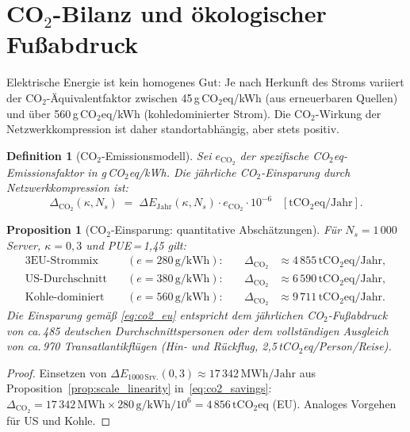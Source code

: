 ﻿\documentclass[12pt, a4paper, openany]{report}
\newtheorem{proposition}[theorem]{Proposition}
\newtheorem{definition}[theorem]{Definition}
\begin{document}
\section{CO\texorpdfstring{$_2$}{2}-Bilanz und ökologischer Fußabdruck}
\label{sec:co2}

Elektrische Energie ist kein homogenes Gut: Je nach Herkunft des
Stroms variiert der CO{$_2$}-Äquivalentfaktor zwischen 45\,g\,CO$_2$eq/kWh
(aus erneuerbaren Quellen) und über 560\,g\,CO$_2$eq/kWh (kohledominierter
Strom).  Die CO$_2$-Wirkung der Netzwerkkompression ist daher
standortabhängig, aber stets positiv.

\begin{definition}[CO$_2$-Emissionsmodell]
\label{def:co2_model}
Sei $e_{\mathrm{CO_2}}$ der spezifische CO$_2$eq-Emissionsfaktor in
g\,CO$_2$eq/kWh.  Die jährliche CO$_2$-Einsparung durch
Netzwerkkompression ist:
\begin{equation}
  \label{eq:co2_savings}
  \Delta_{\mathrm{CO_2}}(\kappa, N_s)
  \;=\;
  \Delta E_{\mathrm{Jahr}}(\kappa, N_s) \cdot e_{\mathrm{CO_2}} \cdot 10^{-6}
  \;\;\;[\mathrm{tCO_2eq/Jahr}].
\end{equation}
\end{definition}

\begin{proposition}[CO$_2$-Einsparung: quantitative Abschätzungen]
\label{prop:co2_estimates}
Für $N_s = 1\,000$ Server, $\kappa = 0{,}3$ und PUE\,=\,1{,}45 gilt:
\begin{alignat}{3}
  \text{EU-Strommix}   &\quad(e = 280\,\mathrm{g/kWh}):\quad&
    \Delta_{\mathrm{CO_2}} &\approx 4\,855\,\mathrm{tCO_2eq/Jahr}, \label{eq:co2_eu} \\
  \text{US-Durchschnitt}&\quad(e = 380\,\mathrm{g/kWh}):\quad&
    \Delta_{\mathrm{CO_2}} &\approx 6\,590\,\mathrm{tCO_2eq/Jahr}, \label{eq:co2_us} \\
  \text{Kohle-dominiert}&\quad(e = 560\,\mathrm{g/kWh}):\quad&
    \Delta_{\mathrm{CO_2}} &\approx 9\,711\,\mathrm{tCO_2eq/Jahr}. \label{eq:co2_cn}
\end{alignat}
Die Einsparung gemäß \eqref{eq:co2_eu} entspricht dem jährlichen
CO$_2$-Fußabdruck von ca.\,485 deutschen Durchschnittspersonen oder
dem vollständigen Ausgleich von ca.\,970 Transatlantikflügen
(Hin- und Rückflug, 2{,}5\,tCO$_2$eq/Person/Reise).
\end{proposition}

\begin{proof}
Einsetzen von $\Delta E_{1000\,\mathrm{Srv.}}(0{,}3) \approx 17\,342\,\mathrm{MWh/Jahr}$
aus Proposition~\ref{prop:scale_linearity} in~\eqref{eq:co2_savings}:
$\Delta_{\mathrm{CO_2}} = 17\,342\,\mathrm{MWh} \times 280\,\mathrm{g/kWh} / 10^6 = 4\,856\,\mathrm{tCO_2eq}$
(EU).  Analoges Vorgehen für US und Kohle.
\end{proof}
\end{document}
